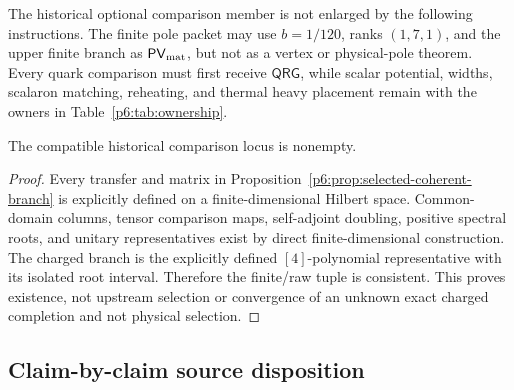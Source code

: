\documentclass[12pt,a4paper]{article}
\begin{document}
\begin{remark}
\label{p6:rem:selected-downstream-comparisons}
The historical optional comparison member is not enlarged by the following
instructions.  The finite pole packet may use \(b=1/120\), ranks
\((1,7,1)\), and the upper finite branch as
\(\mathsf{PV}_{\rm mat}\), but not as a vertex or physical-pole theorem.
Every quark comparison must first receive \(\mathsf{QRG}\), while scalar
potential, widths, scalaron matching, reheating, and thermal heavy placement
remain with the owners in Table~\ref{p6:tab:ownership}.
\end{remark}

\begin{corollary}
\label{p6:cor:nonempty-compatible-locus}
The compatible historical comparison locus is nonempty.
\end{corollary}

\begin{proof}
Every transfer and matrix in
Proposition~\ref{p6:prop:selected-coherent-branch} is explicitly defined on a
finite-dimensional Hilbert space.  Common-domain columns, tensor comparison
maps, self-adjoint doubling, positive spectral roots, and unitary
representatives exist by direct finite-dimensional construction.  The
charged branch is the explicitly defined \([4]\)-polynomial representative
with its isolated root interval.  Therefore the finite/raw tuple is
consistent.  This proves existence, not upstream selection or convergence
of an unknown exact charged completion and not physical selection.
\end{proof}

\subsection{Claim-by-claim source disposition}
\label{p6:sec:source-disposition}
\end{document}
